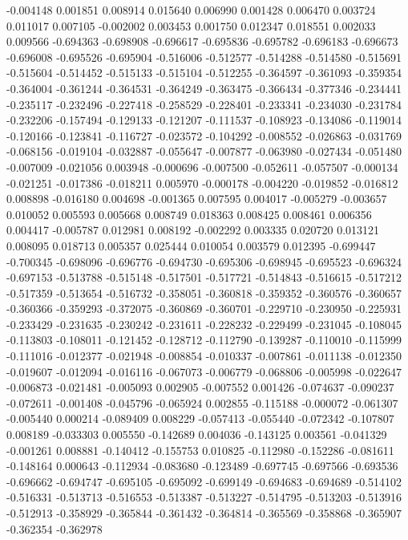 -0.004148
0.001851
0.008914
0.015640
0.006990
0.001428
0.006470
0.003724
0.011017
0.007105
-0.002002
0.003453
0.001750
0.012347
0.018551
0.002033
0.009566
-0.694363
-0.698908
-0.696617
-0.695836
-0.695782
-0.696183
-0.696673
-0.696008
-0.695526
-0.695904
-0.516006
-0.512577
-0.514288
-0.514580
-0.515691
-0.515604
-0.514452
-0.515133
-0.515104
-0.512255
-0.364597
-0.361093
-0.359354
-0.364004
-0.361244
-0.364531
-0.364249
-0.363475
-0.366434
-0.377346
-0.234441
-0.235117
-0.232496
-0.227418
-0.258529
-0.228401
-0.233341
-0.234030
-0.231784
-0.232206
-0.157494
-0.129133
-0.121207
-0.111537
-0.108923
-0.134086
-0.119014
-0.120166
-0.123841
-0.116727
-0.023572
-0.104292
-0.008552
-0.026863
-0.031769
-0.068156
-0.019104
-0.032887
-0.055647
-0.007877
-0.063980
-0.027434
-0.051480
-0.007009
-0.021056
0.003948
-0.000696
-0.007500
-0.052611
-0.057507
-0.000134
-0.021251
-0.017386
-0.018211
0.005970
-0.000178
-0.004220
-0.019852
-0.016812
0.008898
-0.016180
0.004698
-0.001365
0.007595
0.004017
-0.005279
-0.003657
0.010052
0.005593
0.005668
0.008749
0.018363
0.008425
0.008461
0.006356
0.004417
-0.005787
0.012981
0.008192
-0.002292
0.003335
0.020720
0.013121
0.008095
0.018713
0.005357
0.025444
0.010054
0.003579
0.012395
-0.699447
-0.700345
-0.698096
-0.696776
-0.694730
-0.695306
-0.698945
-0.695523
-0.696324
-0.697153
-0.513788
-0.515148
-0.517501
-0.517721
-0.514843
-0.516615
-0.517212
-0.517359
-0.513654
-0.516732
-0.358051
-0.360818
-0.359352
-0.360576
-0.360657
-0.360366
-0.359293
-0.372075
-0.360869
-0.360701
-0.229710
-0.230950
-0.225931
-0.233429
-0.231635
-0.230242
-0.231611
-0.228232
-0.229499
-0.231045
-0.108045
-0.113803
-0.108011
-0.121452
-0.128712
-0.112790
-0.139287
-0.110010
-0.115999
-0.111016
-0.012377
-0.021948
-0.008854
-0.010337
-0.007861
-0.011138
-0.012350
-0.019607
-0.012094
-0.016116
-0.067073
-0.006779
-0.068806
-0.005998
-0.022647
-0.006873
-0.021481
-0.005093
0.002905
-0.007552
0.001426
-0.074637
-0.090237
-0.072611
-0.001408
-0.045796
-0.065924
0.002855
-0.115188
-0.000072
-0.061307
-0.005440
0.000214
-0.089409
0.008229
-0.057413
-0.055440
-0.072342
-0.107807
0.008189
-0.033303
0.005550
-0.142689
0.004036
-0.143125
0.003561
-0.041329
-0.001261
0.008881
-0.140412
-0.155753
0.010825
-0.112980
-0.152286
-0.081611
-0.148164
0.000643
-0.112934
-0.083680
-0.123489
-0.697745
-0.697566
-0.693536
-0.696662
-0.694747
-0.695105
-0.695092
-0.699149
-0.694683
-0.694689
-0.514102
-0.516331
-0.513713
-0.516553
-0.513387
-0.513227
-0.514795
-0.513203
-0.513916
-0.512913
-0.358929
-0.365844
-0.361432
-0.364814
-0.365569
-0.358868
-0.365907
-0.362354
-0.362978
